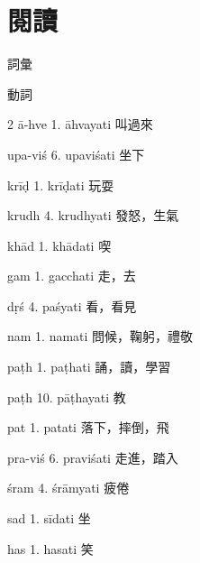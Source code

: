 \documentclass[aspectratio=169]{beamer}
\begin{document}
\section{閱讀}
\begin{frame}{詞彙}
    \begin{block}{動詞}
        \begin{VocabCols}{2}
             ā-hve 1.  āhvayati 叫過來
            
             upa-viś 6.  upaviśati 坐下
            
             krīḍ 1.  krīḍati 玩耍
            
             krudh 4.  krudhyati 發怒，生氣
            
             khād 1.  khādati 喫
            
             gam 1.  gacchati 走，去
            
             dṛś 4.  paśyati 看，看見
            
             nam 1.  namati 問候，鞠躬，禮敬
            
             paṭh 1.  paṭhati 誦，讀，學習
            
             paṭh 10.  pāṭhayati 教
            
             pat 1.  patati 落下，摔倒，飛
            
             pra-viś 6.  praviśati 走進，踏入
            
             śram 4.  śrāmyati 疲倦
            
             sad 1.  sīdati 坐
            
             has 1.  hasati 笑
        \end{VocabCols}
    \end{block}
\end{frame}
\end{document}
